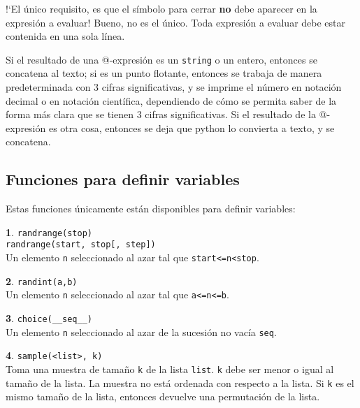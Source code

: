 \documentclass[12pt]{article}
\theoremstyle{definition}
\newtheorem{funcion}{}[section]
\begin{document}
!`El \'unico requisito, es que el s\'imbolo para cerrar \textbf{no} debe aparecer en la expresi\'on a evaluar! Bueno, no es el \'unico. Toda expresi\'on a evaluar debe estar contenida en una sola l\'inea.

Si el resultado de una @-expresi\'on es un \verb|string| o un entero, entonces se concatena al texto; si es un punto flotante, entonces se trabaja de manera predeterminada con 3 cifras significativas, y se imprime el n\'umero en notaci\'on decimal o en notaci\'on cient\'ifica, dependiendo de c\'omo se permita saber de la forma m\'as clara que se tienen 3 cifras significativas. Si el resultado de la @-expresi\'on es otra cosa, entonces se deja que python lo convierta a texto, y se concatena.

\subsection{Funciones para definir variables}

Estas funciones \'unicamente est\'an disponibles para definir variables:

\begin{funcion}
  \verb|randrange(stop)| \\
  \verb|randrange(start, stop[, step])| \\[1ex]
  Un elemento \verb|n| seleccionado al azar tal que \verb|start<=n<stop|.
\end{funcion}

\begin{funcion}
  \verb|randint(a,b)| \\[1ex]
  Un elemento \verb|n| seleccionado al azar tal que \verb|a<=n<=b|.
\end{funcion}

\begin{funcion}
  \verb|choice(__seq__)| \\[1ex]
  Un elemento \verb|n| seleccionado al azar de la sucesión no vacía \verb|seq|.
\end{funcion}

\begin{funcion}
  \verb|sample(<list>, k)| \\[1ex]
  Toma una muestra de tamaño \verb|k| de la lista \verb|list|. \verb|k| debe ser menor o igual al tamaño de la lista. La muestra no está ordenada con respecto a la lista. Si \verb|k| es el mismo tama\~no de la lista, entonces devuelve una permutaci\'on de la lista.
\end{funcion}
\end{document}
